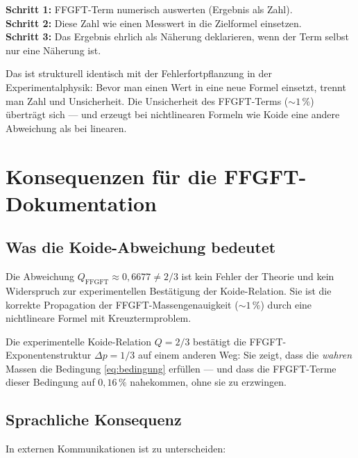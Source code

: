 \begin{keyresult}[Kompositionsregel]
\textbf{Schritt 1:} FFGFT-Term numerisch auswerten (Ergebnis als Zahl).\\
\textbf{Schritt 2:} Diese Zahl wie einen Messwert in die Zielformel einsetzen.\\
\textbf{Schritt 3:} Das Ergebnis ehrlich als Näherung deklarieren,
  wenn der Term selbst nur eine Näherung ist.
\end{keyresult}

Das ist strukturell identisch mit der Fehlerfortpflanzung in der
Experimentalphysik: Bevor man einen Wert in eine neue Formel einsetzt,
trennt man Zahl und Unsicherheit. Die Unsicherheit des FFGFT-Terms
($\sim 1\,\%$) überträgt sich — und erzeugt bei nichtlinearen Formeln
wie Koide eine andere Abweichung als bei linearen.

\section{Konsequenzen für die FFGFT-Dokumentation}

\subsection{Was die Koide-Abweichung bedeutet}

Die Abweichung $Q_{\text{FFGFT}} \approx 0{,}6677 \neq 2/3$ ist kein Fehler
der Theorie und kein Widerspruch zur experimentellen Bestätigung der
Koide-Relation. Sie ist die korrekte Propagation der FFGFT-Massengenauigkeit
($\sim 1\,\%$) durch eine nichtlineare Formel mit Kreuztermproblem.

Die experimentelle Koide-Relation $Q = 2/3$ bestätigt die
FFGFT-Exponentenstruktur $\Delta p = 1/3$ auf einem anderen Weg:
Sie zeigt, dass die \emph{wahren} Massen die Bedingung \eqref{eq:bedingung}
erfüllen — und dass die FFGFT-Terme dieser Bedingung auf $0{,}16\,\%$ nahekommen,
ohne sie zu erzwingen.

\subsection{Sprachliche Konsequenz}

In externen Kommunikationen ist zu unterscheiden:

